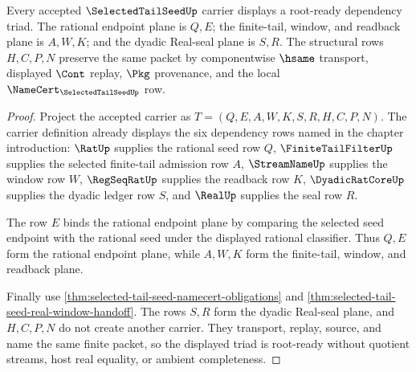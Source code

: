 \begin{theorem}
\label{thm:selected-tail-seed-dependency-readiness-triad}
Every accepted $\SelectedTailSeedUp$ carrier displays a root-ready dependency triad. The rational endpoint plane is $Q,E$; the finite-tail, window, and readback plane is $A,W,K$; and the dyadic Real-seal plane is $S,R$. The structural rows $H,C,P,N$ preserve the same packet by componentwise $\hsame$ transport, displayed $\Cont$ replay, $\Pkg$ provenance, and the local $\NameCert_{\SelectedTailSeedUp}$ row.
\end{theorem}
\begin{proof}
Project the accepted carrier as $T=(Q,E,A,W,K,S,R,H,C,P,N)$. The carrier definition already displays the six dependency rows named in the chapter introduction: $\RatUp$ supplies the rational seed row $Q$, $\FiniteTailFilterUp$ supplies the selected finite-tail admission row $A$, $\StreamNameUp$ supplies the window row $W$, $\RegSeqRatUp$ supplies the readback row $K$, $\DyadicRatCoreUp$ supplies the dyadic ledger row $S$, and $\RealUp$ supplies the seal row $R$.

The row $E$ binds the rational endpoint plane by comparing the selected seed endpoint with the rational seed under the displayed rational classifier. Thus $Q,E$ form the rational endpoint plane, while $A,W,K$ form the finite-tail, window, and readback plane.

Finally use \autoref{thm:selected-tail-seed-namecert-obligations} and \autoref{thm:selected-tail-seed-real-window-handoff}. The rows $S,R$ form the dyadic Real-seal plane, and $H,C,P,N$ do not create another carrier. They transport, replay, source, and name the same finite packet, so the displayed triad is root-ready without quotient streams, host real equality, or ambient completeness.
\end{proof}

